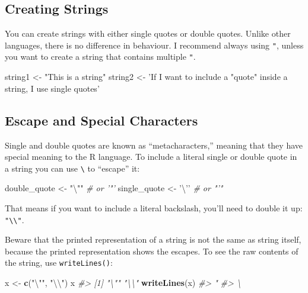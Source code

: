 \documentclass[]{book}
\newenvironment{Shaded}{\begin{snugshade}}{\end{snugshade}}
\newcommand{\KeywordTok}[1]{\textcolor[rgb]{0.13,0.29,0.53}{\textbf{#1}}}
\newcommand{\CharTok}[1]{\textcolor[rgb]{0.31,0.60,0.02}{#1}}
\newcommand{\StringTok}[1]{\textcolor[rgb]{0.31,0.60,0.02}{#1}}
\newcommand{\CommentTok}[1]{\textcolor[rgb]{0.56,0.35,0.01}{\textit{#1}}}
\newcommand{\NormalTok}[1]{#1}
\begin{document}
\subsection{Creating Strings}\label{creating-strings}

You can create strings with either single quotes or double quotes.
Unlike other languages, there is no difference in behaviour. I recommend
always using \texttt{"}, unless you want to create a string that
contains multiple \texttt{"}.

\begin{Shaded}
\begin{Highlighting}[]
\NormalTok{string1 <-}\StringTok{ "This is a string"}
\NormalTok{string2 <-}\StringTok{ 'If I want to include a "quote" inside a string, I use single quotes'}
\end{Highlighting}
\end{Shaded}

\subsection{Escape and Special
Characters}\label{escape-and-special-characters}

Single and double quotes are known as ``metacharacters,'' meaning that
they have special meaning to the R language. To include a literal single
or double quote in a string you can use \texttt{\textbackslash{}} to
``escape'' it:

\begin{Shaded}
\begin{Highlighting}[]
\NormalTok{double_quote <-}\StringTok{ "}\CharTok{\textbackslash{}"}\StringTok{"} \CommentTok{# or '"'}
\NormalTok{single_quote <-}\StringTok{ '}\CharTok{\textbackslash{}'}\StringTok{'} \CommentTok{# or "'"}
\end{Highlighting}
\end{Shaded}

That means if you want to include a literal backslash, you'll need to
double it up: \texttt{"\textbackslash{}\textbackslash{}"}.

Beware that the printed representation of a string is not the same as
string itself, because the printed representation shows the escapes. To
see the raw contents of the string, use \texttt{writeLines()}:

\begin{Shaded}
\begin{Highlighting}[]
\NormalTok{x <-}\StringTok{ }\KeywordTok{c}\NormalTok{(}\StringTok{"}\CharTok{\textbackslash{}"}\StringTok{"}\NormalTok{, }\StringTok{"}\CharTok{\textbackslash{}\textbackslash{}}\StringTok{"}\NormalTok{)}
\NormalTok{x}
\CommentTok{#> [1] "\textbackslash{}"" "\textbackslash{}\textbackslash{}"}
\KeywordTok{writeLines}\NormalTok{(x)}
\CommentTok{#> "}
\CommentTok{#> \textbackslash{}}
\end{Highlighting}
\end{Shaded}
\end{document}
